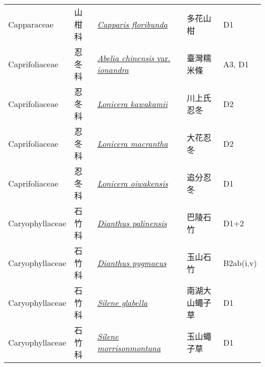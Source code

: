 {\begin{longtable}{L{2.5cm}L{2cm}L{5cm}L{2.5cm}L{3cm}}
    Capparaceae & 山柑科 & \href{http://www.theplantlist.org/tpl1.1/search?q=Capparis+floribunda}{\textit{Capparis floribunda} } & 多花山柑 & D1    \\
    Caprifoliaceae & 忍冬科 & \href{http://www.theplantlist.org/tpl1.1/search?q=Abelia+chinensis+var.+ionandra}{\textit{Abelia chinensis} var. \textit{ionandra} } & 臺灣糯米條 & A3, D1    \\
    Caprifoliaceae & 忍冬科 & \href{http://www.theplantlist.org/tpl1.1/search?q=Lonicera+kawakamii}{\textit{Lonicera kawakamii} } & 川上氏忍冬 & D2    \\
    Caprifoliaceae & 忍冬科 & \href{http://www.theplantlist.org/tpl1.1/search?q=Lonicera+macrantha}{\textit{Lonicera macrantha} } & 大花忍冬 & D2    \\
    Caprifoliaceae & 忍冬科 & \href{http://www.theplantlist.org/tpl1.1/search?q=Lonicera+oiwakensis}{\textit{Lonicera oiwakensis} } & 追分忍冬 & D1    \\
    Caryophyllaceae & 石竹科 & \href{http://www.theplantlist.org/tpl1.1/search?q=Dianthus+palinensis}{\textit{Dianthus palinensis} } & 巴陵石竹 & D1+2    \\
    Caryophyllaceae & 石竹科 & \href{http://www.theplantlist.org/tpl1.1/search?q=Dianthus+pygmaeus}{\textit{Dianthus pygmaeus} } & 玉山石竹 & B2ab(i,v)    \\
    Caryophyllaceae & 石竹科 & \href{http://www.theplantlist.org/tpl1.1/search?q=Silene+glabella}{\textit{Silene glabella} } & 南湖大山蠅子草 & D1    \\
    Caryophyllaceae & 石竹科 & \href{http://www.theplantlist.org/tpl1.1/search?q=Silene+morrisonmontana}{\textit{Silene morrisonmontana} } & 玉山蠅子草 & D1    \\

\end{longtable}}
